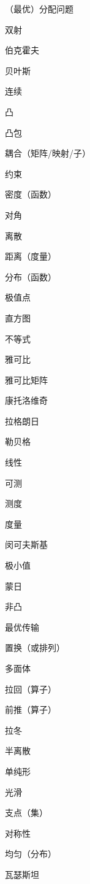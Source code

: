 \documentclass[cn,10pt,math=newtx,citestyle=gb7714-2015,bibstyle=gb7714-2015]{elegantbook}
\begin{document}
\begin{minipage}[b]{0.24\textwidth}

（最优）分配问题

双射

伯克霍夫

贝叶斯

连续

凸

凸包

耦合（矩阵/映射/子）

约束

密度（函数）

对角

离散

距离（度量）

分布（函数）

极值点

直方图

不等式

雅可比

雅可比矩阵

康托洛维奇

拉格朗日

勒贝格

线性

可测

测度

度量

闵可夫斯基

极小值

蒙日

非凸

最优传输

置换（或排列）

多面体

拉回（算子）

前推（算子）

拉冬

半离散

单纯形

光滑

支点（集）

对称性

均匀（分布）

瓦瑟斯坦

\end{minipage}
\end{document}
